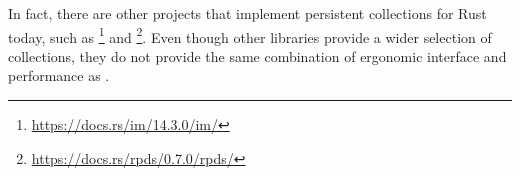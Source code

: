 In fact, there are other projects that implement persistent collections for Rust today, such as \imrs{}\footnote{\url{https://docs.rs/im/14.3.0/im/}} and \rpds{}\footnote{\url{https://docs.rs/rpds/0.7.0/rpds/}}. Even though other libraries provide a wider selection of collections, they do not provide the same combination of ergonomic interface and performance as \pvecrs{}. 

